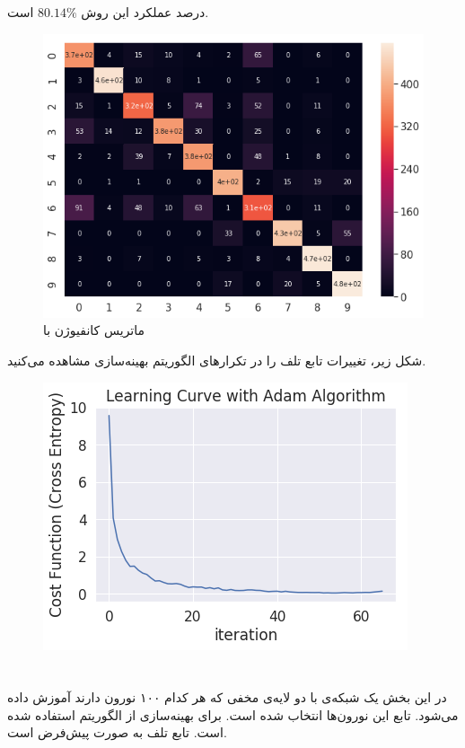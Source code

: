 \documentclass[a4paper]{article}
\begin{document}
\begin{large}
  درصد عملکرد این روش 
 $80.14 \%$
 است.
\begin{figure}[h!]
	\centering
	\includegraphics[scale=0.6]{adam.png}
	\caption{ماتریس کانفیوژن 
		با 
	}
\end{figure}
شکل زیر، تغییرات تابع تلف را در تکرارهای الگوریتم بهینه‌سازی مشاهده می‌کنید.
\begin{figure}[h!]
	\centering
	\includegraphics[scale=0.6]{adam2.png}
	\caption{
	}
\end{figure}

\newpage
\section{}
در این بخش یک شبکه‌ی 
با دو لایه‌ی مخفی که هر کدام ۱۰۰ نورون دارند آموزش داده‌ می‌شود. تابع 
این نورون‌ها 
انتخاب شده است. برای بهینه‌سازی از الگوریتم 
استفاده شده است. تابع تلف به صورت پیش‌فرض
است.


\end{large}
\end{document}
